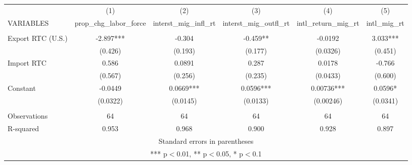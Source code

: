 \begin{tabular}{lccccc} \hline
 & (1) & (2) & (3) & (4) & (5) \\
VARIABLES & prop\_chg\_labor\_force & interst\_mig\_infl\_rt & interst\_mig\_outfl\_rt & intl\_return\_mig\_rt & intl\_mig\_rt \\ \hline
 &  &  &  &  &  \\
Export RTC (U.S.) & -2.897*** & -0.304 & -0.459** & -0.0192 & 3.033*** \\
 & (0.426) & (0.193) & (0.177) & (0.0326) & (0.451) \\
Import RTC & 0.586 & 0.0891 & 0.287 & 0.0178 & -0.766 \\
 & (0.567) & (0.256) & (0.235) & (0.0433) & (0.600) \\
Constant & -0.0449 & 0.0669*** & 0.0596*** & 0.00736*** & 0.0596* \\
 & (0.0322) & (0.0145) & (0.0133) & (0.00246) & (0.0341) \\
 &  &  &  &  &  \\
Observations & 64 & 64 & 64 & 64 & 64 \\
 R-squared & 0.953 & 0.968 & 0.900 & 0.928 & 0.897 \\ \hline
\multicolumn{6}{c}{ Standard errors in parentheses} \\
\multicolumn{6}{c}{ *** p$<$0.01, ** p$<$0.05, * p$<$0.1} \\
\end{tabular}
